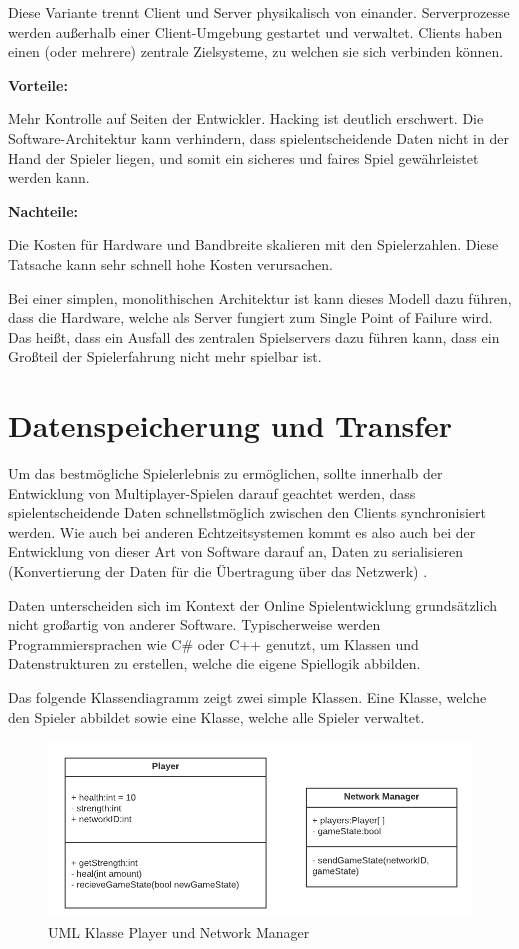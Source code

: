 Diese Variante trennt Client und Server physikalisch von einander. Serverprozesse werden außerhalb einer Client-Umgebung gestartet und verwaltet. Clients haben einen (oder mehrere) zentrale Zielsysteme, zu welchen sie sich verbinden können.

\textbf{Vorteile:}

Mehr Kontrolle auf Seiten der Entwickler. Hacking ist deutlich erschwert. Die Software-Architektur kann verhindern, dass spielentscheidende Daten nicht in der Hand der Spieler liegen, und somit ein sicheres und faires Spiel gewährleistet werden kann.
\cite{Smed.2002}

\textbf{Nachteile:}

Die Kosten für Hardware und Bandbreite skalieren mit den Spielerzahlen. Diese Tatsache kann sehr schnell hohe Kosten verursachen. \cite{Deng.2018}

Bei einer simplen, monolithischen Architektur ist kann dieses Modell dazu führen, dass die Hardware, welche als Server fungiert zum Single Point of Failure wird. Das heißt, dass ein Ausfall des zentralen Spielservers dazu führen kann, dass ein Großteil der Spielerfahrung nicht mehr spielbar ist.

\section{Datenspeicherung und Transfer}

Um das bestmögliche Spielerlebnis zu ermöglichen, sollte innerhalb der Entwicklung von Multiplayer-Spielen darauf geachtet werden, dass spielentscheidende Daten schnellstmöglich zwischen den Clients synchronisiert werden. Wie auch bei anderen Echtzeitsystemen \cite{Wikipedia.2021} kommt es also auch bei der Entwicklung von dieser Art von Software darauf an, Daten zu serialisieren (Konvertierung der Daten für die Übertragung über das Netzwerk) \cite{Wikipedia.2019}. 

Daten unterscheiden sich im Kontext der Online Spielentwicklung grundsätzlich nicht großartig von anderer Software. Typischerweise werden Programmiersprachen wie C\# oder C++ genutzt, um Klassen und Datenstrukturen zu erstellen, welche die eigene Spiellogik abbilden. \cite{Glinka.2008}

Das folgende Klassendiagramm zeigt zwei simple Klassen. Eine Klasse, welche den Spieler abbildet sowie eine Klasse, welche alle Spieler verwaltet.

\begin{figure}
	\centering
	\includegraphics[width=150mm]{images/UML_class_Player_NM.png}
	\caption[UML Klassen]{UML Klasse Player und Network Manager}
	\label{pic:UML_class_Player_NM}
\end{figure}

